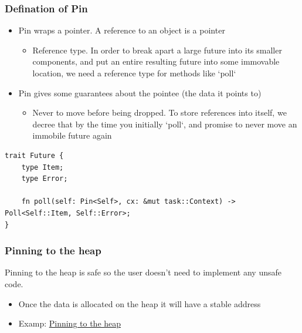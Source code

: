\begin{frame}[fragile]
    \frametitle{Defination of Pin}
% 
% 
    \begin{itemize}
        \item Pin wraps a pointer. A reference to an object is a pointer
    	\begin{itemize}
    	    \item {\color{red}Reference type}. In order to break apart a large future into its smaller components, and put  an entire resulting future into some immovable location, we need a reference type for methods like `poll`
    	\end{itemize} \pause
        \item Pin gives some guarantees about the {\color{red}pointee} (the data it points to)
    	\begin{itemize}
    	    \item {\color{red}Never to move before being dropped}. To store references into itself, we decree that by the time you initially `poll`, and promise to never move an immobile future again
    	\end{itemize}
    \end{itemize} \pause
% 
\begin{block}{}
    \begin{verbatim}
trait Future {
    type Item;
    type Error;

    fn poll(self: Pin<Self>, cx: &mut task::Context) -> Poll<Self::Item, Self::Error>;
} \end{verbatim}
\end{block}
% 
\end{frame}
\begin{frame}[fragile]
    \frametitle{Pinning to the heap}
% 
% 
Pinning to the heap is safe so the user doesn't need to implement any unsafe code.
% 
    \begin{itemize}
        \item Once the data is allocated on the heap it will have a stable address \pause
        \item Examp: \href{https://cfsamson.github.io/books-futures-explained/4_pin.html}{Pinning to the heap}
    \end{itemize}

\end{frame}

